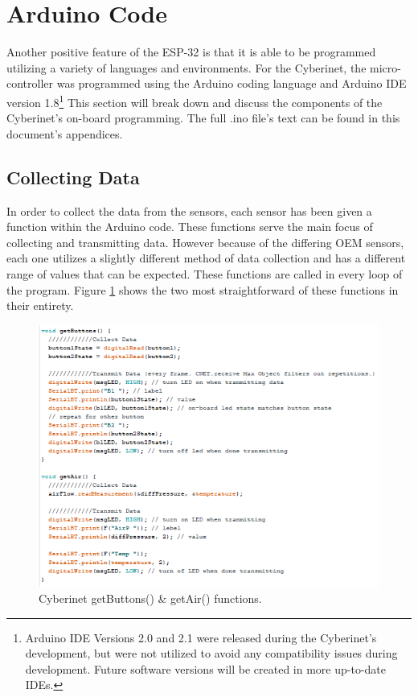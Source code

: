 \section{Arduino Code}
Another positive feature of the ESP-32 is that it is able to be programmed utilizing a variety of languages and environments. For the Cyberinet, the micro-controller was programmed using the Arduino coding language and Arduino IDE version 1.8\footnote{Arduino IDE Versions 2.0 and 2.1 were released during the Cyberinet's development, but were not utilized to avoid any compatibility issues during development. Future software versions will be created in more up-to-date IDEs.} This section will break down and discuss the components of the Cyberinet's on-board programming. The full .ino file's text can be found in this document's appendices.

\subsection{Collecting Data}
In order to collect the data from the sensors, each sensor has been given a function within the Arduino code. These functions serve the main focus of collecting and transmitting data. However because of the differing OEM sensors, each one utilizes a slightly different method of data collection and has a different range of values that can be expected. These functions are called in every loop of the program. Figure \ref{fig:getButtonsGetAir} shows the two most straightforward of these functions in their entirety.

\begin{center}
    \begin{figure}
        \centering
        \includegraphics[scale=1.5]{diagrams/maxPatches/getbuttonsgetair.png}
        \caption{Cyberinet getButtons() \& getAir() functions.}
        \label{fig:getButtonsGetAir}
    \end{figure}
\end{center}

